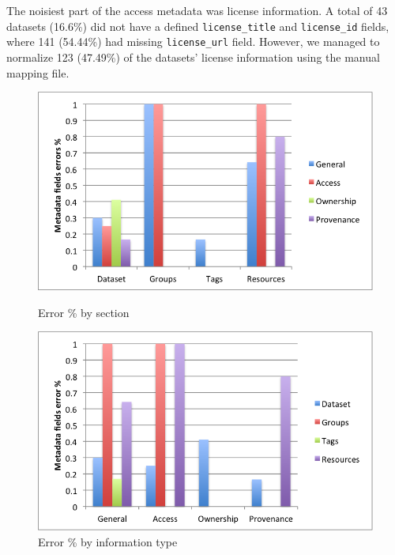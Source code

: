 \documentclass[runningheads,a4paper]{llncs}
\begin{document}
The noisiest part of the access metadata was license information. A total of 43 datasets (16.6\%) did not have a defined \texttt{license\_title} and \texttt{license\_id} fields, where 141 (54.44\%) had missing \texttt{license\_url} field. However, we managed to normalize 123 (47.49\%) of the datasets' license information using the manual mapping file.

\begin{figure}

\parbox{7cm}{\hspace*{-.2in}
\includegraphics[width=.95\linewidth]{metadata_noise_by_section.png}
\captionsetup{textfont=small,singlelinecheck=off,justification=centering}
\caption{Error \% by section}
\label{fig:2}}
\qquad
\begin{minipage}{7cm}\hspace*{-.6in}
\includegraphics[width=.95\linewidth]{metadata_noise_by_metadata_type.png}
\captionsetup{textfont=small,singlelinecheck=off,justification=raggedright}
\caption{Error \% by information type}
\label{fig:3}
\end{minipage}

\end{figure}
\end{document}
